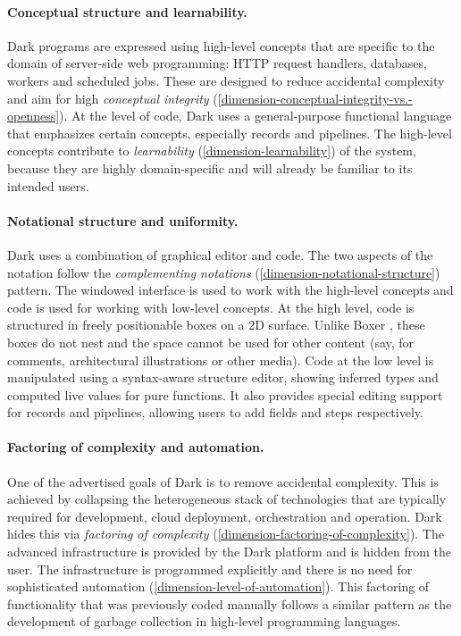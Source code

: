 \paragraph{Conceptual structure and learnability.}

Dark programs are expressed using high-level concepts that are specific
to the domain of server-side web programming: HTTP request handlers,
databases, workers and scheduled jobs. These are designed to reduce
accidental complexity and aim for high \emph{conceptual integrity}
(\ref{dimension-conceptual-integrity-vs.-openness}). At the level of
code, Dark uses a general-purpose functional language that emphasizes
certain concepts, especially records and pipelines. The high-level
concepts contribute to \emph{learnability}
(\ref{dimension-learnability}) of the system, because they are highly
domain-specific and will already be familiar to its intended users.

\paragraph{Notational structure and uniformity.}

Dark uses a combination of graphical editor and code. The two aspects of
the notation follow the \emph{complementing notations}
(\ref{dimension-notational-structure}) pattern. The windowed interface
is used to work with the high-level concepts and code is used for
working with low-level concepts. At the high level, code is structured
in freely positionable boxes on a 2D surface. Unlike Boxer \cite{Boxer},
these boxes do not nest and the space cannot be used for other content
(say, for comments, architectural illustrations or other media). Code at
the low level is manipulated using a syntax-aware structure editor,
showing inferred types and computed live values for pure functions. It
also provides special editing support for records and pipelines,
allowing users to add fields and steps respectively.

\paragraph{Factoring of complexity and automation.}

One of the advertised goals of Dark is to remove accidental complexity.
This is achieved by collapsing the heterogeneous stack of technologies
that are typically required for development, cloud deployment,
orchestration and operation. Dark hides this via \emph{factoring of
complexity} (\ref{dimension-factoring-of-complexity}). The advanced
infrastructure is provided by the Dark platform and is hidden from the
user. The infrastructure is programmed explicitly and there is no need
for sophisticated automation (\ref{dimension-level-of-automation}). This
factoring of functionality that was previously coded manually follows a
similar pattern as the development of garbage collection in high-level
programming languages.

